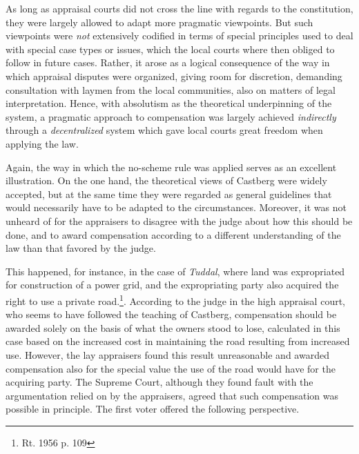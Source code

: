 As long as appraisal courts did not cross the line with regards to the constitution, they were largely allowed to adapt more pragmatic viewpoints. But such viewpoints were \emph{not} extensively codified in terms of special principles used to deal with special case types or issues, which the local courts where then obliged to follow in future cases. Rather, it arose as a logical consequence of the way in which appraisal disputes were organized, giving room for discretion, demanding consultation with laymen from the local communities, also on matters of legal interpretation. Hence, with absolutism as the theoretical underpinning of the system, a pragmatic approach to compensation was largely achieved \emph{indirectly} through a \emph{decentralized} system which gave local courts great freedom when applying the law. 

Again, the way in which the no-scheme rule was applied serves as an excellent illustration. On the one hand, the theoretical views of Castberg were widely accepted, but at the same time they were regarded as general guidelines that would necessarily have to be adapted to the circumstances. Moreover, it was not unheard of for the appraisers to disagree with the judge about how this should be done, and to award compensation according to a different understanding of the law than that favored by the judge. 

This happened, for instance, in the case of \emph{Tuddal}, where land was expropriated for construction of a power grid, and the expropriating party also acquired the right to use a private road.\footnote{Rt. 1956 p. 109}. According to the judge in the high appraisal court, who seems to have followed the teaching of Castberg, compensation should be awarded solely on the basis of what the owners stood to lose, calculated in this case based on the increased cost in maintaining the road resulting from increased use. However, the lay appraisers found this result unreasonable and awarded compensation also for the special value the use of the road would have for the acquiring party. The Supreme Court, although they found fault with the argumentation relied on by the appraisers, agreed that such compensation was possible in principle. The first voter offered the following perspective.

